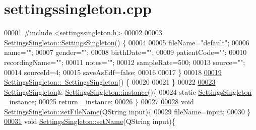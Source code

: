 \hypertarget{settingssingleton_8cpp_source}{}\section{settingssingleton.\+cpp}
\label{settingssingleton_8cpp_source}

\begin{DoxyCode}
00001 \textcolor{preprocessor}{#include <\hyperlink{settingssingleton_8h}{settingssingleton.h}>}
00002 
\hypertarget{settingssingleton_8cpp_source.tex_l00003}{}\hyperlink{classSettingsSingleton_af3d8ea55c2c625c0b6504b472d8664af}{00003} \hyperlink{classSettingsSingleton_af3d8ea55c2c625c0b6504b472d8664af}{SettingsSingleton::SettingsSingleton}() \{
00004 
00005     fileName=\textcolor{stringliteral}{"default"};
00006     name=\textcolor{stringliteral}{""};
00007     gender=\textcolor{stringliteral}{""};
00008     birthDate=\textcolor{stringliteral}{""};
00009     patientCode=\textcolor{stringliteral}{""};
00010     recordingName=\textcolor{stringliteral}{""};
00011     notes=\textcolor{stringliteral}{""};
00012     sampleRate=500;
00013     source=\textcolor{stringliteral}{""};
00014     sourceId=4;
00015     saveAsEdf=\textcolor{keyword}{false};
00016 
00017 \}
00018 
\hypertarget{settingssingleton_8cpp_source.tex_l00019}{}\hyperlink{classSettingsSingleton_a91b78db84657cbeb299c30e4aac3c269}{00019} \hyperlink{classSettingsSingleton_a91b78db84657cbeb299c30e4aac3c269}{SettingsSingleton::~SettingsSingleton}() \{
00020 
00021 \}
00022 
\hypertarget{settingssingleton_8cpp_source.tex_l00023}{}\hyperlink{classSettingsSingleton_aad528becd7ce5903c418a5b8b718074c}{00023} \hyperlink{classSettingsSingleton}{SettingsSingleton}& \hyperlink{classSettingsSingleton_aad528becd7ce5903c418a5b8b718074c}{SettingsSingleton::instance}()\{
00024     \textcolor{keyword}{static} \hyperlink{classSettingsSingleton}{SettingsSingleton} \_instance;
00025     \textcolor{keywordflow}{return} \_instance;
00026 \}
00027 
\hypertarget{settingssingleton_8cpp_source.tex_l00028}{}\hyperlink{classSettingsSingleton_aec045fc249983ef4ac0de4ba8925b300}{00028} \textcolor{keywordtype}{void} \hyperlink{classSettingsSingleton_aec045fc249983ef4ac0de4ba8925b300}{SettingsSingleton::setFileName}(QString input)\{
00029     fileName=input;
00030 \}
\hypertarget{settingssingleton_8cpp_source.tex_l00031}{}\hyperlink{classSettingsSingleton_a383c335986ea26502cb65886a9fea1ac}{00031}     \textcolor{keywordtype}{void} \hyperlink{classSettingsSingleton_a383c335986ea26502cb65886a9fea1ac}{SettingsSingleton::setName}(QString input)\{

\end{DoxyCode}
